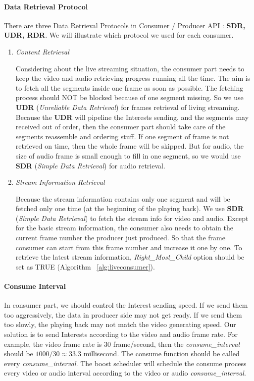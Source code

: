 \paragraph{Data Retrieval Protocol}
There are three Data Retrieval Protocols in Consumer / Producer API : \textbf{SDR, UDR, RDR}. We will illustrate which protocol we used for each consumer.
\begin{enumerate}
	\item {\textit{Content Retrieval}}
	
	Considering about the live streaming situation, the consumer part needs to keep the video and audio retrieving progress running all the time. The aim is to fetch all the segments inside one frame as soon as possible. The fetching process should NOT be blocked because of one segment missing. So we use \textbf{UDR} (\textit{Unreliable Data Retrieval}) for frames retrieval of living streaming. Because the \textbf{UDR} will pipeline the Interests sending, and the segments may received out of order, then the consumer part should take care of the segments reassemble and ordering stuff. If one segment of frame is not retrieved on time, then the whole frame will be skipped. But for audio, the size of audio frame is small enough to fill in one segment, so we would use \textbf{SDR} (\textit{Simple Data Retrieval}) for audio retrieval.

	\item {\textit{Stream Information Retrieval}} %
	
	Because the stream information contains only one segment and will be fetched only one time (at the beginning of the playing back). We use \textbf{SDR} (\textit{Simple Data Retrieval}) to fetch the stream info for video and audio. Except for the basic stream information, the consumer also needs to obtain the current frame number the producer just produced. So that the frame consumer can start from this frame number and increase it one by one. To retrieve the latest stream information, \textit{Right\_Most\_Child} option should be set as TRUE (Algorithm ~\ref{alg:liveconsumer}).
\end{enumerate}

\paragraph{Consume Interval} %
\label{par:consume_interval}
In consumer part, we should control the Interest sending speed. If we send them too aggressively, the data in producer side may not get ready. If we send them too slowly, the playing back may not match the video generating speed. Our solution is to send Interests according to the video and audio frame rate. For example, the video frame rate is 30 frame/second, then the \textit{consume\_interval} should be $1000/30 \approx {33.3}$ millisecond. The consume function should be called every \textit{consume\_interval}.
The boost scheduler will schedule the consume process every video or audio interval according to the video or audio \textit{consume\_interval}. 
